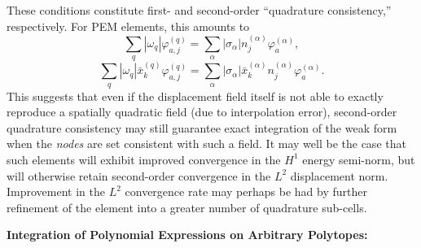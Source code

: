 \documentclass[11pt]{article} %
\begin{document}
These conditions constitute first- and second-order ``quadrature consistency,'' respectively. For PEM elements, this amounts to
\begin{equation}
	\sum_{q} | \omega_q | \varphi_{a,j}^{(q)} = \sum_{\alpha} | \sigma_{\alpha} | n_j^{(\alpha)} \varphi_a^{(\alpha)},
\end{equation}
\begin{equation}
	\sum_{q} | \omega_q | \bar{x}_k^{(q)} \varphi_{a,j}^{(q)} = \sum_{\alpha} | \sigma_{\alpha} | \bar{x}_k^{(\alpha)} n_j^{(\alpha)} \varphi_a^{(\alpha)}.
\end{equation}
This suggests that even if the displacement field itself is not able to exactly reproduce a spatially quadratic field (due to interpolation error), second-order quadrature consistency may still guarantee exact integration of the weak form when the \textit{nodes} are set consistent with such a field. It may well be the case that such elements will exhibit improved convergence in the $H^1$ energy semi-norm, but will otherwise retain second-order convergence in the $L^2$ displacement norm. Improvement in the $L^2$ convergence rate may perhaps be had by further refinement of the element into a greater number of quadrature sub-cells.

\newpage

\begin{center}
\textbf{Integration of Polynomial Expressions on Arbitrary Polytopes:}
\end{center}
\end{document}
